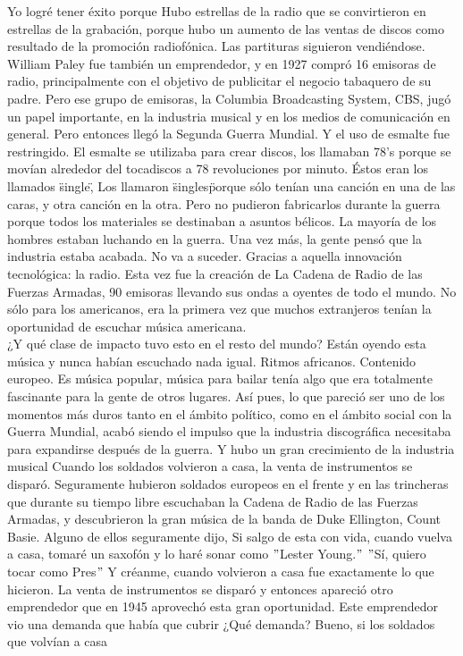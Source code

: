 \documentclass[10pt]{book}
\begin{document}
Yo logré tener éxito porque Hubo estrellas de la radio que se convirtieron en estrellas de la grabación, porque hubo un aumento de las ventas de discos como resultado de la promoción radiofónica. Las partituras siguieron vendiéndose. William Paley fue también un emprendedor,  y en 1927 compró 16 emisoras de radio, principalmente con el objetivo de publicitar el negocio tabaquero de su padre. Pero ese grupo de emisoras, la Columbia Broadcasting System, CBS, jugó un papel importante, en la industria musical y en los medios de comunicación en general. Pero entonces llegó la Segunda Guerra Mundial. Y el uso de esmalte fue restringido. El esmalte se utilizaba para crear discos, los llamaban 78's porque se movían alrededor del tocadiscos a 78 revoluciones por minuto. Éstos eran los llamados \"single\", Los llamaron \" singles\" porque sólo tenían  una canción en una de las caras, y otra canción en la otra. Pero no pudieron fabricarlos durante la guerra porque todos los materiales se destinaban a asuntos bélicos. La mayoría de los hombres estaban luchando en la guerra. Una vez más, la gente pensó que la industria estaba acabada. No va a suceder. Gracias a aquella innovación tecnológica: la radio. Esta vez fue la creación de La Cadena de Radio de las Fuerzas Armadas, 90 emisoras llevando sus ondas a oyentes de todo el mundo. No sólo para los americanos, era la primera vez que muchos extranjeros tenían la oportunidad de escuchar música americana. \\
¿Y qué clase de impacto tuvo esto en el resto del mundo? Están oyendo esta música y  nunca habían escuchado nada igual. Ritmos africanos. Contenido europeo. Es música popular, música para bailar tenía algo que era totalmente fascinante  para la gente de otros lugares. Así pues,  lo que pareció ser uno de los momentos  más duros tanto en el ámbito político, como en el ámbito social con la Guerra Mundial,  acabó siendo el impulso que la industria discográfica necesitaba para expandirse después de la guerra. Y hubo un gran crecimiento de la industria musical Cuando los soldados volvieron a casa, la venta de instrumentos se disparó. Seguramente hubieron soldados europeos en  el frente y en las trincheras que durante su tiempo libre escuchaban la Cadena de Radio de las Fuerzas Armadas, y descubrieron la gran música de la banda de Duke Ellington, Count Basie. Alguno de ellos seguramente dijo,  Si salgo de esta con vida, cuando vuelva a casa, tomaré un saxofón y lo haré sonar como $"$Lester Young.$"$ $"$Sí, quiero tocar como Pres$"$ Y créanme,  cuando volvieron a casa fue exactamente lo que hicieron. La venta de instrumentos se disparó y entonces apareció otro emprendedor que en 1945 aprovechó esta gran oportunidad. Este emprendedor vio una demanda  que había que cubrir ¿Qué demanda? Bueno, si los soldados que volvían a casa
\end{document}
